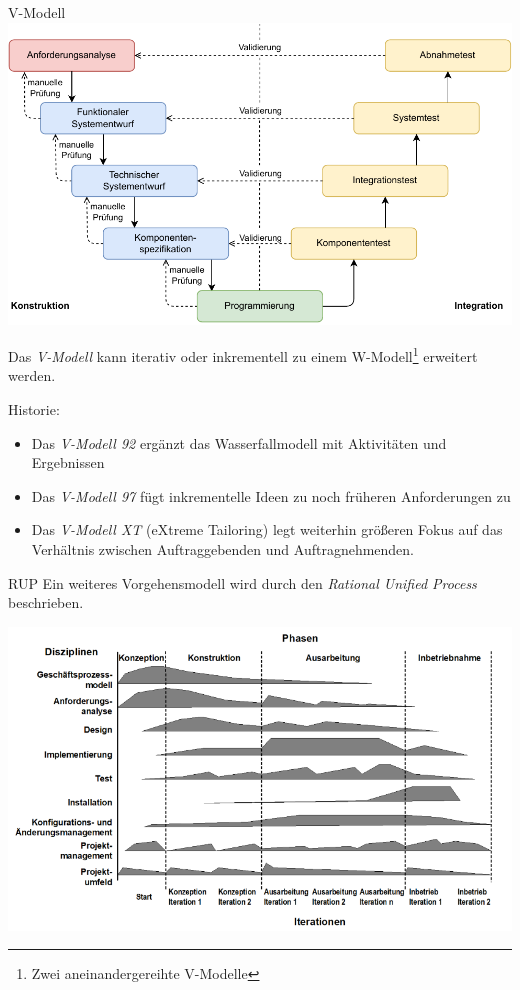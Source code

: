 \begin{defi}{V-Modell}
    \includegraphics[width=\textwidth]{includes/figures/defi_v_model.pdf}

    Das \emph{V-Modell} kann iterativ oder inkrementell zu einem W-Modell\footnote{Zwei aneinandergereihte V-Modelle} erweitert werden.

    Historie:
    \begin{itemize}
        \item Das \emph{V-Modell 92} ergänzt das Wasserfallmodell mit Aktivitäten und Ergebnissen
        \item Das \emph{V-Modell 97} fügt inkrementelle Ideen zu noch früheren Anforderungen zu
        \item Das \emph{V-Modell XT} (eXtreme Tailoring) legt weiterhin größeren Fokus auf das Verhältnis zwischen Auftraggebenden und Auftragnehmenden.
    \end{itemize}
\end{defi}

\begin{defi}{RUP}
    Ein weiteres Vorgehensmodell wird durch den \emph{Rational Unified Process} beschrieben.

    \includegraphics[width=\textwidth]{includes/figures/defi_RUP.png}
\end{defi}

